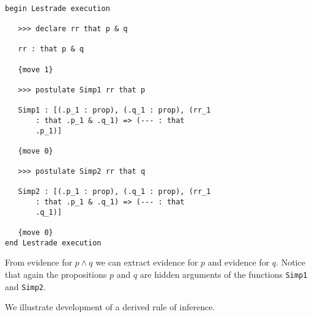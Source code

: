 \documentclass[12pt]{article}
\begin{document}
\begin{verbatim}

begin Lestrade execution

   >>> declare rr that p & q

   rr : that p & q

   {move 1}

   >>> postulate Simp1 rr that p

   Simp1 : [(.p_1 : prop), (.q_1 : prop), (rr_1 
       : that .p_1 & .q_1) => (--- : that 
       .p_1)]

   {move 0}

   >>> postulate Simp2 rr that q

   Simp2 : [(.p_1 : prop), (.q_1 : prop), (rr_1 
       : that .p_1 & .q_1) => (--- : that 
       .q_1)]

   {move 0}
end Lestrade execution

\end{verbatim}

From evidence for $p \wedge q$ we can extract evidence for $p$ and evidence for $q$.  Notice that again the propositions $p$ and $q$ are hidden arguments of the functions {\tt Simp1} and {\tt Simp2}.

\newpage

We illustrate development of a derived rule of inference.
\end{document}
